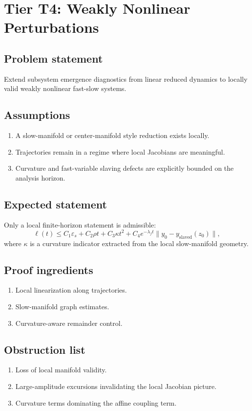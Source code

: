 \section{Tier T4: Weakly Nonlinear Perturbations}

\subsection{Problem statement}
Extend subsystem emergence diagnostics from linear reduced dynamics to locally valid weakly nonlinear fast-slow systems.

\subsection{Assumptions}
\begin{enumerate}
\item A slow-manifold or center-manifold style reduction exists locally.
\item Trajectories remain in a regime where local Jacobians are meaningful.
\item Curvature and fast-variable slaving defects are explicitly bounded on the analysis horizon.
\end{enumerate}

\subsection{Expected statement}
Only a local finite-horizon statement is admissible:
\[
\ell(t)
\le
C_1 \varepsilon_s
+
C_2 \rho t
+
C_3 \kappa t^2
+
C_4 e^{-\lambda_f t}\|y_0 - y_{\mathrm{slaved}}(z_0)\|,
\]
where $\kappa$ is a curvature indicator extracted from the local slow-manifold geometry.

\subsection{Proof ingredients}
\begin{enumerate}
\item Local linearization along trajectories.
\item Slow-manifold graph estimates.
\item Curvature-aware remainder control.
\end{enumerate}

\subsection{Obstruction list}
\begin{enumerate}
\item Loss of local manifold validity.
\item Large-amplitude excursions invalidating the local Jacobian picture.
\item Curvature terms dominating the affine coupling term.
\end{enumerate}

